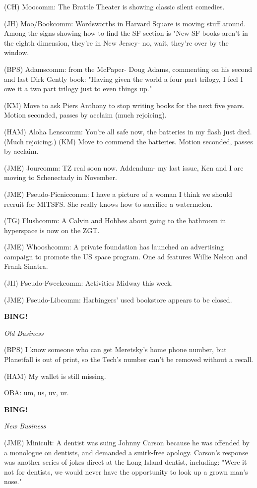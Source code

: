 \documentclass[12pt]{article}
\newcommand{\bing}{{\bf BING!} }
\newcommand{\goto}[1]{\bing \vskip 12pt \centerline{{\em{#1}}}}
\begin{document}
(CH) Moocomm: The Brattle Theater is showing classic silent comedies.

(JH) Moo/Bookcomm: Wordsworths in Harvard Square is moving stuff around. Among the signs showing how to find the SF section is "New SF books aren't in the eighth dimension, they're in New Jersey- no, wait, they're over by the window.

(BPS) Adamscomm: from the McPaper- Doug Adams, commenting on his second and last Dirk Gently book: "Having given the world a four part trilogy, I feel I owe it a two part trilogy just to even things up."

(KM) Move to ask Piers Anthony to stop writing books for the next five years. Motion seconded, passes by acclaim (much rejoicing).

(HAM) Aloha Lenscomm: You're all safe now, the batteries in my flash just died. (Much rejoicing.) (KM) Move to commend the batteries. Motion seconded, passes by acclaim.

(JME) Jourcomm: TZ real soon now. Addendum- my last issue, Ken and I are moving to Schenectady in November.

(JME) Pseudo-Picniccomm: I have a picture of a woman I think we should recruit for MITSFS. She really knows how to sacrifice a watermelon.

(TG) Flushcomm: A Calvin and Hobbes about going to the bathroom in hyperspace is now on the ZGT.

(JME) Whooshcomm: A private foundation has launched an advertising campaign to promote the US space program. One ad features Willie Nelson and Frank Sinatra.

(JH) Pseudo-Fweekcomm: Activities Midway this week.

(JME) Pseudo-Libcomm: Harbingers' used bookstore appears to be closed.

\goto{Old Business}

(BPS) I know someone who can get Meretsky's home phone number, but Planetfall is out of print, so the Tech's number can't be removed without a recall.

(HAM) My wallet is still missing.

OBA: um, us, uv, ur.

\goto{New Business}

(JME) Minicult: A dentist was suing Johnny Carson because he was offended by a monologue on dentists, and demanded a smirk-free apology. Carson's response was another series of jokes direct at the Long Island dentist, including: "Were it not for dentists, we would never have the opportunity to look up a grown man's nose."
\end{document}
